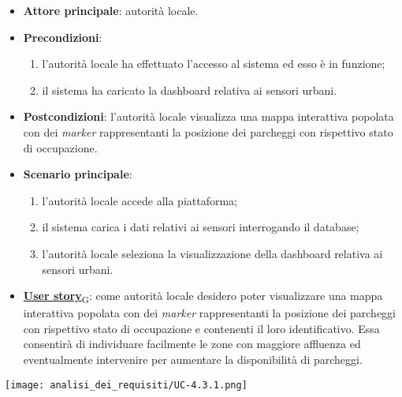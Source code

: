 \begin{itemize}
	\item \textbf{Attore principale}: autorità locale.
	\item \textbf{Precondizioni}:
	      \begin{enumerate}
		      \item l'autorità locale ha effettuato l'accesso al sistema ed esso è in funzione;
		      \item il sistema ha caricato la dashboard relativa ai sensori urbani.
	      \end{enumerate}
	\item \textbf{Postcondizioni}: l'autorità locale visualizza una mappa interattiva popolata con dei \textit{marker} rappresentanti la posizione dei parcheggi con rispettivo stato di occupazione.
	\item \textbf{Scenario principale}:
	      \begin{enumerate}
		      \item l'autorità locale accede alla piattaforma;
		      \item il sistema carica i dati relativi ai sensori interrogando il database;
		      \item l'autorità locale seleziona la visualizzazione della dashboard relativa ai sensori urbani.
	      \end{enumerate}
	\item \href{https://7last.github.io/docs/pb/documentazione-interna/glossario\#user-story}{\textbf{User story}\textsubscript{G}}:
	      come autorità locale desidero poter visualizzare una mappa interattiva popolata con dei \textit{marker} rappresentanti la posizione dei parcheggi con rispettivo stato di occupazione
	      e contenenti il loro identificativo. Essa consentirà di individuare facilmente le zone con maggiore affluenza ed eventualmente intervenire per aumentare la disponibilità di parcheggi.
\end{itemize}
\begin{center}
	\texttt{[image: analisi\_dei\_requisiti/UC-4.3.1.png]}
\end{center}

